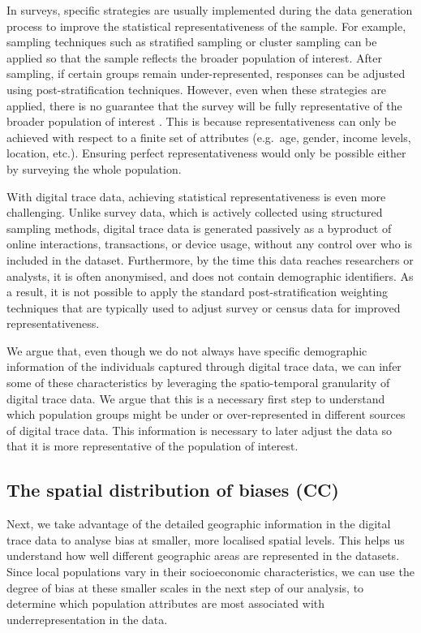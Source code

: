 \documentclass[]{rsos}%
\begin{document}
In surveys, specific strategies are usually implemented during the data
generation process to improve the statistical representativeness of the
sample. For example, sampling techniques such as stratified sampling or
cluster sampling can be applied so that the sample reflects the broader
population of interest. After sampling, if certain groups remain
under-represented, responses can be adjusted using post-stratification
techniques. However, even when these strategies are applied, there is no
guarantee that the survey will be fully representative of the broader
population of interest \citep{cochran1977sampling}. This is because
representativeness can only be achieved with respect to a finite set of
attributes (e.g.~age, gender, income levels, location, etc.). Ensuring
perfect representativeness would only be possible either by surveying
the whole population.

With digital trace data, achieving statistical representativeness is
even more challenging. Unlike survey data, which is actively collected
using structured sampling methods, digital trace data is generated
passively as a byproduct of online interactions, transactions, or device
usage, without any control over who is included in the dataset.
Furthermore, by the time this data reaches researchers or analysts, it
is often anonymised, and does not contain demographic identifiers. As a
result, it is not possible to apply the standard post-stratification
weighting techniques that are typically used to adjust survey or census
data for improved representativeness.

We argue that, even though we do not always have specific demographic
information of the individuals captured through digital trace data, we
can infer some of these characteristics by leveraging the
spatio-temporal granularity of digital trace data. We argue that this is
a necessary first step to understand which population groups might be
under or over-represented in different sources of digital trace data.
This information is necessary to later adjust the data so that it is
more representative of the population of interest.

\subsection{The spatial distribution of biases (CC)}\label{the-spatial-distribution-of-biases-cc}

Next, we take advantage of the detailed geographic information in the
digital trace data to analyse bias at smaller, more localised spatial
levels. This helps us understand how well different geographic areas are
represented in the datasets. Since local populations vary in their
socioeconomic characteristics, we can use the degree of bias at these
smaller scales in the next step of our analysis, to determine which
population attributes are most associated with underrepresentation in
the data.
\end{document}
